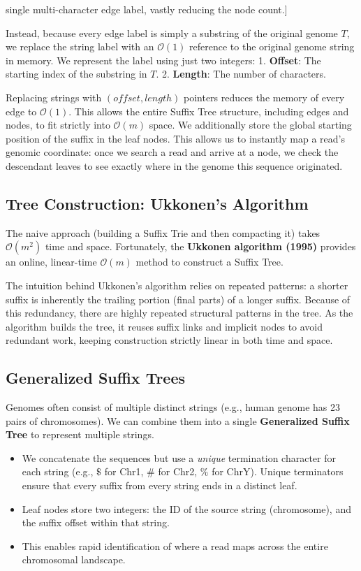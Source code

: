 single multi-character edge label, vastly reducing the node count.]


Instead, because every edge label is simply a substring of the original genome \(T\), we replace the string label with an \(\mathcal{O}(1)\) reference to the original genome string in memory. We represent the label using just two integers:
1. \textbf{Offset}: The starting index of the substring in \(T\).
2. \textbf{Length}: The number of characters.

Replacing strings with \((offset, length)\) pointers reduces the memory of every edge to \(\mathcal{O}(1)\). This allows the entire Suffix Tree structure, including edges and nodes, to fit strictly into \(\mathcal{O}(m)\) space.
We additionally store the global starting position of the suffix in the leaf nodes. This allows us to instantly map a read's genomic coordinate: once we search a read and arrive at a node, we check the descendant leaves to see exactly where in the genome this sequence originated.

\subsection{Tree Construction: Ukkonen's Algorithm}

The naive approach (building a Suffix Trie and then compacting it) takes \(\mathcal{O}(m^2)\) time and space.
Fortunately, the \textbf{Ukkonen algorithm (1995)} provides an online, linear-time \(\mathcal{O}(m)\) method to construct a Suffix Tree.

\sta The intuition behind Ukkonen's algorithm relies on repeated patterns: a shorter suffix is inherently the trailing portion (final parts) of a longer suffix. Because of this redundancy, there are highly repeated structural patterns in the tree. As the algorithm builds the tree, it reuses suffix links and implicit nodes to avoid redundant work, keeping construction strictly linear in both time and space.

\subsection{Generalized Suffix Trees}

Genomes often consist of multiple distinct strings (e.g., human genome has 23 pairs of chromosomes). We can combine them into a single \textbf{Generalized Suffix Tree} to represent multiple strings.
\begin{itemize}
    \item We concatenate the sequences but use a \textit{unique} termination character for each string (e.g., \(\$\) for Chr1, \(\#\) for Chr2, \(\%\) for ChrY). Unique terminators ensure that every suffix from every string ends in a distinct leaf.
    \item Leaf nodes store two integers: the ID of the source string (chromosome), and the suffix offset within that string.
    \item This enables rapid identification of where a read maps across the entire chromosomal landscape.
\end{itemize}


